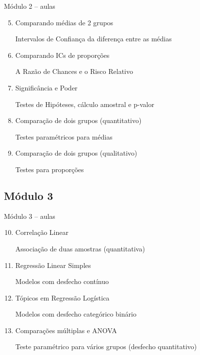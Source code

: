 \documentclass{beamer}
\begin{document}
\begin{frame}{\scriptsize Módulo 2 -- aulas}
  \begin{enumerate}
    \setcounter{enumi}{4}
  \item Comparando médias de 2 grupos

    {\tiny Intervalos de Confiança da diferença entre as médias}
    \bigskip
  \item Comparando ICs de proporções

    {\tiny A Razão de Chances e o Risco Relativo}
    \bigskip
  \item Significância e Poder

    {\tiny Testes de Hipóteses, cálculo amostral e p-valor}
    \bigskip
  \item Comparação de dois grupos (quantitativo)

    {\tiny Testes paramétricos para médias}
    \bigskip
  \item Comparação de dois grupos (qualitativo)

    {\tiny Testes para proporções}

  \end{enumerate}
\end{frame}

\subsection{Módulo 3}

\begin{frame}{\scriptsize Módulo 3 -- aulas}
  \begin{enumerate}
    \setcounter{enumi}{9}
  \item Correlação Linear

    {\tiny Associação de duas amostras (quantitativa)}
    \bigskip
  \item Regressão Linear Simples

    {\tiny Modelos com desfecho contínuo}
    \bigskip
  \item Tópicos em Regressão Logística

    {\tiny Modelos com desfecho categórico binário}
    \bigskip
  \item Comparações múltiplas e ANOVA

    {\tiny Teste paramétrico para vários grupos (desfecho quantitativo)}
  \end{enumerate}
\end{frame}
\end{document}
